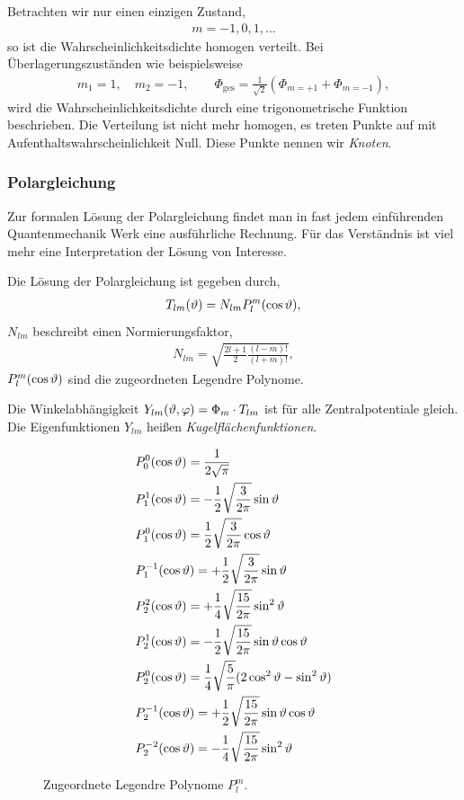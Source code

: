 Betrachten wir nur einen einzigen Zustand,
\begin{align*}
m = -1,0,1,\ldots
\end{align*}
so ist die Wahrscheinlichkeitsdichte homogen verteilt. Bei
Überlagerungszuständen wie beispielsweise
\begin{align*}
m_1 = 1,\quad m_2 = -1,\qquad \Phi_\text{ges} = \frac{1}{\sqrt{2}}\left(
\Phi_{m=+1} + \Phi_{m=-1} \right),
\end{align*}
wird die Wahrscheinlichkeitsdichte durch eine trigonometrische Funktion
beschrieben. Die Verteilung ist nicht mehr homogen, es treten Punkte auf
mit Aufenthaltswahrscheinlichkeit Null. Diese Punkte nennen wir \emph{Knoten}.

\subsubsection{Polargleichung}

Zur formalen Lösung der Polargleichung findet man in fast jedem einführenden
Quantenmechanik Werk eine ausführliche Rechnung. Für das Verständnis ist viel
mehr eine Interpretation der Lösung von Interesse.

Die Lösung der Polargleichung ist gegeben durch,
\begin{align*}
T_{lm}(\vartheta) = N_{lm} P_{l}^m(\cos\vartheta),
\end{align*}
$N_{lm}$ beschreibt einen Normierungsfaktor,
\begin{align*}
N_{lm} = \sqrt{\frac{2l+1}{2}\frac{(l-m)!}{(l+m)!}},
\end{align*}
$P_l^m(\cos\vartheta)$ sind die zugeordneten Legendre Polynome.

\begin{bemn}
Die Winkelabhängigkeit $Y_{lm}(\vartheta,\varphi)=\Phi_m\cdot T_{lm}$ ist für alle
Zentralpotentiale gleich. Die Eigenfunktionen $Y_{lm}$ heißen
\emph{Kugelflächenfunktionen}.\maphere
\end{bemn}

\begin{figure}[!htbp]
	\centering
	\begin{align*}
    &P_{0}^{0}(\cos\vartheta) = \frac{1}{2\sqrt{\pi}}\\
    &P_{1}^{1}(\cos\vartheta) = -\frac{1}{2}\sqrt{\frac{3}{2\pi}}\sin\vartheta\\
    &P_{1}^{0}(\cos\vartheta) = \frac{1}{2}\sqrt{\frac{3}{2\pi}}\cos\vartheta\\
    &P_{1}^{-1}(\cos\vartheta) = +\frac{1}{2}\sqrt{\frac{3}{2\pi}}\sin\vartheta\\
    &P_{2}^{2}(\cos\vartheta) = +\frac{1}{4}\sqrt{\frac{15}{2\pi}}\sin^2\vartheta\\
    &P_{2}^{1}(\cos\vartheta) = -\frac{1}{2}\sqrt{\frac{15}{2\pi}}\sin\vartheta\cos\vartheta\\
    &P_{2}^{0}(\cos\vartheta) = \frac{1}{4}\sqrt{\frac{5}{\pi}}(2\cos^2\vartheta -
    \sin^2\vartheta)\\
    &P_{2}^{-1}(\cos\vartheta) = +\frac{1}{2}\sqrt{\frac{15}{2\pi}}\sin\vartheta\cos\vartheta\\
    &P_{2}^{-2}(\cos\vartheta) = -\frac{1}{4}\sqrt{\frac{15}{2\pi}}\sin^2\vartheta
    \end{align*}
	\caption{Zugeordnete Legendre Polynome $P_l^m$.}
\end{figure}

